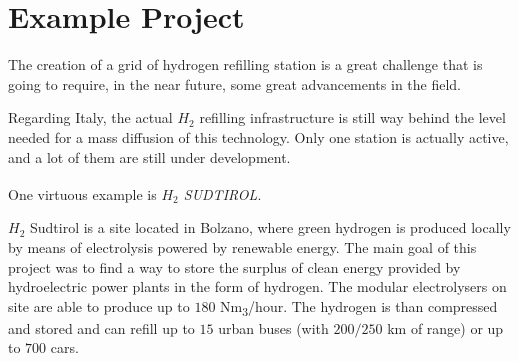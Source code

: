 \section{Example Project}

The creation of a grid of hydrogen refilling station is a great challenge that is going to require, in the near future, some great advancements in the field. 

Regarding Italy, the actual $H_2$ refilling infrastructure is still way behind the level needed for a mass diffusion of this technology. Only one station is actually active, and a lot of them are still under development.

One virtuous example is \textit{$H_2$ SUDTIROL}\textsuperscript{\cite{centroidrogenobolzano}}.

$H_2$ Sudtirol is a site located in Bolzano, where green hydrogen is produced locally by means of electrolysis powered by renewable energy. The main goal of this project was to find a way to store the surplus of clean energy provided by hydroelectric power plants in the form of hydrogen. The modular electrolysers on site are able to produce up to $180$ Nm\textsubscript{3}/hour. The hydrogen is than compressed and stored and can refill up to $15$ urban buses (with $200/250$ km of range) or up to $700$ cars.
